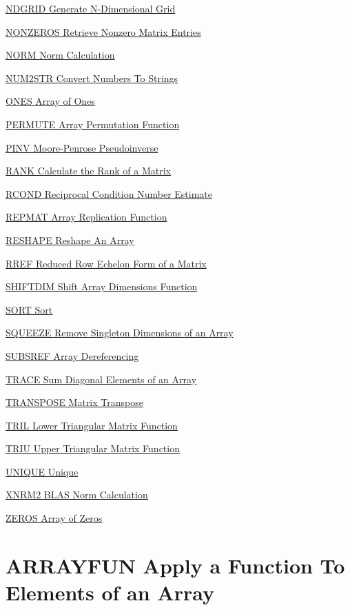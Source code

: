 \begin{DoxyItemize}
\item \hyperlink{array_ndgrid}{N\-D\-G\-R\-I\-D Generate N-\/\-Dimensional Grid}  
\item \hyperlink{array_nonzeros}{N\-O\-N\-Z\-E\-R\-O\-S Retrieve Nonzero Matrix Entries}  
\item \hyperlink{array_norm}{N\-O\-R\-M Norm Calculation}  
\item \hyperlink{array_num2str}{N\-U\-M2\-S\-T\-R Convert Numbers To Strings}  
\item \hyperlink{array_ones}{O\-N\-E\-S Array of Ones}  
\item \hyperlink{array_permute}{P\-E\-R\-M\-U\-T\-E Array Permutation Function}  
\item \hyperlink{array_pinv}{P\-I\-N\-V Moore-\/\-Penrose Pseudoinverse}  
\item \hyperlink{array_rank}{R\-A\-N\-K Calculate the Rank of a Matrix}  
\item \hyperlink{array_rcond}{R\-C\-O\-N\-D Reciprocal Condition Number Estimate}  
\item \hyperlink{array_repmat}{R\-E\-P\-M\-A\-T Array Replication Function}  
\item \hyperlink{array_reshape}{R\-E\-S\-H\-A\-P\-E Reshape An Array}  
\item \hyperlink{array_rref}{R\-R\-E\-F Reduced Row Echelon Form of a Matrix}  
\item \hyperlink{array_shiftdim}{S\-H\-I\-F\-T\-D\-I\-M Shift Array Dimensions Function}  
\item \hyperlink{array_sort}{S\-O\-R\-T Sort }  
\item \hyperlink{array_squeeze}{S\-Q\-U\-E\-E\-Z\-E Remove Singleton Dimensions of an Array}  
\item \hyperlink{array_subsref}{S\-U\-B\-S\-R\-E\-F Array Dereferencing}  
\item \hyperlink{array_trace}{T\-R\-A\-C\-E Sum Diagonal Elements of an Array}  
\item \hyperlink{array_transpose}{T\-R\-A\-N\-S\-P\-O\-S\-E Matrix Transpose }  
\item \hyperlink{array_tril}{T\-R\-I\-L Lower Triangular Matrix Function}  
\item \hyperlink{array_triu}{T\-R\-I\-U Upper Triangular Matrix Function}  
\item \hyperlink{array_unique}{U\-N\-I\-Q\-U\-E Unique}  
\item \hyperlink{array_xnrm2}{X\-N\-R\-M2 B\-L\-A\-S Norm Calculation}  
\item \hyperlink{array_zeros}{Z\-E\-R\-O\-S Array of Zeros}  
\end{DoxyItemize}\hypertarget{array_arrayfun}{}\section{A\-R\-R\-A\-Y\-F\-U\-N Apply a Function To Elements of an Array}\label{array_arrayfun}
